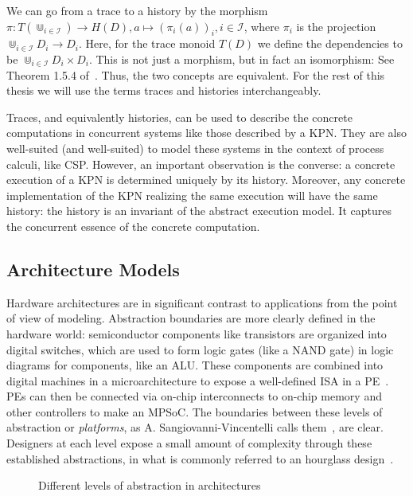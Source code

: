 We can go from a trace to a history by the morphism $\pi: T(\Cup_{i \in \mathcal{I}}) \rightarrow H(D), a \mapsto (\pi_i(a))_i, i \in \mathcal{I}$, where $\pi_i$ is the projection $\Cup_{i \in \mathcal{I}}D_i \rightarrow D_i$.
Here, for the trace monoid $T(D)$ we define the dependencies to be $\Cup_{i \in \mathcal{I}}D_i \times D_i$. 
This is not just a morphism, but in fact an isomorphism: See Theorem 1.5.4 of~\cite{mazurkiewicz1995introduction}.
Thus, the two concepts are equivalent.
For the rest of this thesis we will use the terms traces and histories interchangeably.


Traces, and equivalently histories, can be used to describe the concrete computations in concurrent systems like those described by a \ac{KPN}.
They are also well-suited (and well-suited) to model these systems in the context of process calculi, like \ac{CSP}.
However, an important observation is the converse: a concrete execution of a \ac{KPN} is determined uniquely by its history.
Moreover, any concrete implementation of the \ac{KPN} realizing the same execution will have the same history: the history is an invariant of the abstract execution model.
It captures the concurrent essence of the concrete computation.

\subsection{Architecture Models}
Hardware architectures are in significant contrast to applications from the point of view of modeling.
Abstraction boundaries are more clearly defined in the hardware world: semiconductor components like transistors are organized into digital switches, which are used to form logic gates (like a NAND gate) in logic diagrams for components, like an \ac{ALU}.
These components are combined into digital machines in a microarchitecture to expose a well-defined \acf{ISA} in a \ac{PE}~\cite{lee2017plato}.
\acp{PE} can then be connected via on-chip interconnects to on-chip memory and other controllers to make an \ac{MPSoC}.
The boundaries between these levels of abstraction or \emph{platforms}, as A. Sangiovanni-Vincentelli calls them~\cite{sangiovanni2007quo}, are clear.
Designers at each level expose a small amount of complexity through these established abstractions, in what is commonly referred to an hourglass design~\cite{10.1145/3274770}.

\begin{figure}[h]
	\centering
\resizebox{0.8\textwidth}{!}{
   \begin{tikzpicture}
     
   \end{tikzpicture}
 }
   \caption{Different levels of abstraction in architectures}
   \label{fig:architecture_abstractions}
\end{figure}

